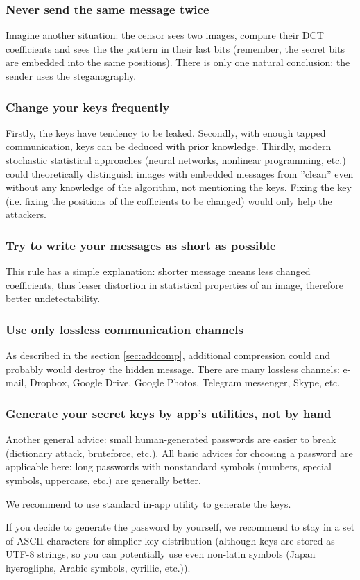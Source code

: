 \subsubsection{Never send the same message twice}

Imagine another situation: the censor sees two images, compare their DCT coefficients
and sees the the pattern in their last bits (remember, the secret bits are embedded into
the same positions). There is only one natural conclusion: the sender uses the steganography.

\subsubsection{Change your keys frequently}
Firstly, the keys have tendency to be leaked. Secondly, with enough tapped communication,
keys can be deduced with prior knowledge. Thirdly, modern stochastic statistical approaches 
(neural networks, nonlinear programming, etc.) could theoretically distinguish images with
embedded messages from ''clean'' even without any knowledge of the algorithm, not mentioning
the keys. Fixing the key (i.e. fixing the positions of the cofficients to be changed)
would only help the attackers.

\subsubsection{Try to write your messages as short as possible}
This rule has a simple explanation: shorter message means less changed coefficients, thus
lesser distortion in statistical properties of an image, therefore better undetectability.

\subsubsection{Use only lossless communication channels}
As described in the section \ref{sec:addcomp}, additional compression could and probably
would destroy the hidden message. There are many lossless channels: e-mail, Dropbox, Google Drive,
Google Photos, Telegram messenger, Skype, etc.

\subsubsection{Generate your secret keys by app's utilities, not by hand}
Another general advice: small human-generated passwords are easier to break (dictionary attack,
bruteforce, etc.). All basic advices for choosing a password are applicable here: long passwords
with nonstandard symbols (numbers, special symbols, uppercase, etc.) are generally better.

We recommend to use standard in-app utility to generate the keys.

If you decide to generate the password by yourself, 
we recommend to stay in a set of ASCII characters for simplier key distribution (although keys are
stored as UTF-8 strings, so you can potentially use even non-latin symbols 
(Japan hyerogliphs, Arabic symbols, cyrillic, etc.)).

